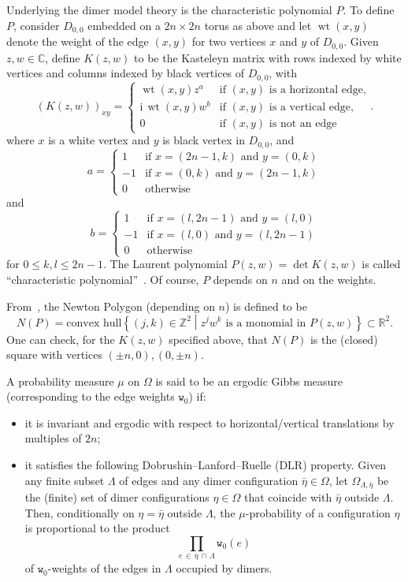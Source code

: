 \documentclass[10pt]{amsart}
\theoremstyle{definition}\newtheorem{defi}[theo]{Definition}\newtheorem{rema}[theo]{Remark}\newtheorem{exam}[theo]{Example}\newtheorem{exem}[theo]{Example}\newtheorem{nota}[theo]{Notation}
\newcommand{\ttw}{\mathtt{w}}
\newcommand{\bbZ}{\mathbb{Z}}
\newcommand{\bbC}{\mathbb{C}}
\newcommand{\bbR}{\mathbb{R}}
\newcommand{\rmi}{\mathrm{i}}
\DeclareMathOperator{\wt}{wt}
\begin{document}
Underlying the dimer model theory is the {characteristic polynomial} $P$. To define $P$, consider $D_{0,0}$ embedded on a $2n\times 2n$ torus as above and let $\wt(x,y)$ denote the weight of the edge $(x,y)$ for two vertices $x$ and $y$ of $D_{0,0}$. Given $z,w\in \bbC$, define $K(z,w)$ to be the Kasteleyn matrix with rows indexed by white vertices and columns indexed by black vertices of $D_{0,0}$, with
\[
(K(z,w))_{xy} =\begin{cases}
\wt(x,y)z^a & \text{if }  (x,y) \text{ is a horizontal edge,}\\
\rmi \,\wt(x,y) w^b & \text{if } (x,y) \text{ is a vertical edge,}\\
0 & \text{if }  (x,y) \text{ is not an edge}
\end{cases}.
\]
where $x$ is a white vertex and $y$ is black vertex in $D_{0,0}$, and
\[
a= 
\begin{cases}
1 & \text{if }x=(2n-1,k)\text{ and }y=(0,k)\\
-1 & \text{if }x=(0,k)\text{ and }y=(2n-1,k)\\
0 & \text{otherwise}
\end{cases}
\]
and
\[
b=
\begin{cases}
1 & \text{if }x=(l,2n-1)\text{ and }y=(l,0)\\
-1 & \text{if }x=(l,0)\text{ and }y=(l,2n-1)\\
0 & \text{otherwise}
\end{cases}
\]
for $0 \leq k,l \leq 2n-1$. The Laurent polynomial $P(z,w)=\det K(z,w)$ is called ``characteristic polynomial''~\cite{KOS03}. Of course, $P$ depends on $n$ and on the weights.

From~\cite{KOS03}, the Newton Polygon (depending on $n$) is defined to be
\[
N(P)=\text{convex hull}\left\{ (j,k) \in \bbZ^2\middle|z^j w^k \text{ is a monomial in }P(z,w) \right\}\subset \bbR^2.
\]
One can check, for the $K(z,w)$ specified above, that $N(P)$ is the (closed) square with vertices $(\pm n,0),(0,\pm n)$.


A probability measure $\mu$ on $\Omega$ is said to be an ergodic Gibbs measure (corresponding to the edge weights $\ttw_0$) if:
\begin{itemize}
\item it is invariant and ergodic with respect to horizontal/vertical translations by multiples of $2n$;
\item it satisfies the following Dobrushin--Lanford--Ruelle (DLR) property. Given any finite subset $\Lambda$ of edges and any dimer configuration $\bar \eta\in \Omega$, let $\Omega_{\Lambda,\bar \eta}$ be the (finite) set of dimer configurations $\eta\in\Omega$ that coincide with $\bar\eta$ outside $\Lambda$. Then, conditionally on $\eta=\bar \eta$ outside $\Lambda$, the $\mu$-probability of a configuration $\eta$ is proportional to the product
\[
\prod_{e\,\in\,\eta\,\cap\,\Lambda} \ttw_0(e)
\]
of $\ttw_0$-weights of the edges in $\Lambda $ occupied by dimers.
\end{itemize}
\end{document}
